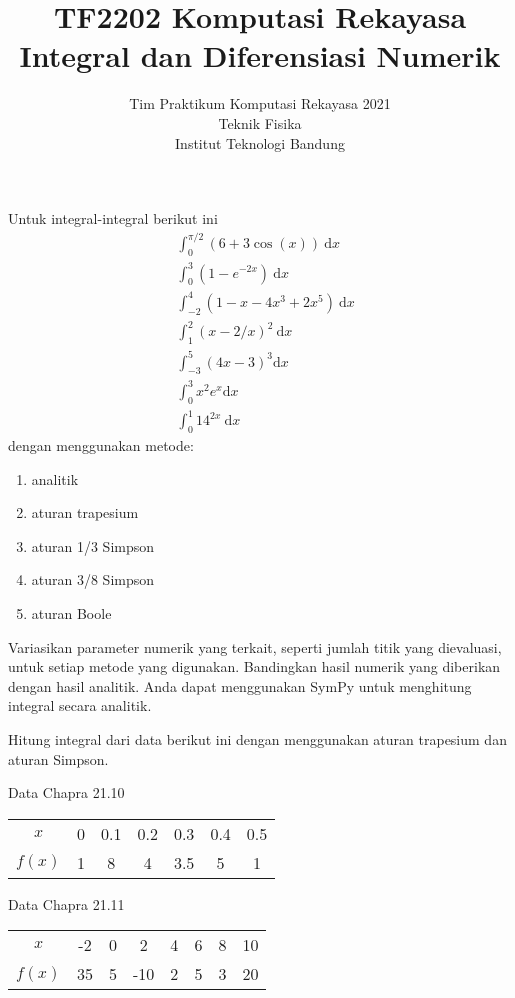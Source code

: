 



\title{%
{\small TF2202 Komputasi Rekayasa}\\
Integral dan Diferensiasi Numerik
}
\author{Tim Praktikum Komputasi Rekayasa 2021\\
Teknik Fisika\\
Institut Teknologi Bandung}
\date{}
\maketitle

\begin{soal}
Untuk integral-integral berikut ini
\begin{align}
& \int_{0}^{\pi/2} (6 + 3\cos(x))\ \mathrm{d}x \\
& \int_{0}^{3} (1 - e^{-2x})\ \mathrm{d}x \\
& \int_{-2}^{4} (1 - x - 4x^3 + 2x^5)\ \mathrm{d}x \\
& \int_{1}^{2} (x - 2/x)^2\ \mathrm{d}x \\
& \int_{-3}^{5} (4x - 3)^3 \mathrm{d}x \\
& \int_{0}^{3} x^2 e^x \mathrm{d}x \\
& \int_{0}^{1} 14^{2x}\ \mathrm{d}x
\end{align}
dengan menggunakan metode:
\begin{enumerate}[label=(\alph*)]
\item analitik
\item aturan trapesium
\item aturan 1/3 Simpson
\item aturan 3/8 Simpson
\item aturan Boole
\end{enumerate}
Variasikan parameter numerik yang terkait, seperti jumlah titik yang dievaluasi,
untuk setiap metode yang digunakan.
Bandingkan hasil numerik yang diberikan dengan hasil analitik.
Anda dapat menggunakan SymPy untuk menghitung integral secara analitik.
\end{soal}

\begin{soal}
Hitung integral dari data berikut ini dengan menggunakan aturan trapesium dan aturan
Simpson.

Data Chapra 21.10

{\centering
\begin{tabular}{|c|cccccc|}
\hline
$x$    & 0 & 0.1 & 0.2 & 0.3 & 0.4 & 0.5 \\
$f(x)$ & 1 & 8   & 4   & 3.5 & 5   & 1 \\
\hline
\end{tabular}
\par}

Data Chapra 21.11

{\centering
\begin{tabular}{|c|ccccccc|}
\hline
$x$    & -2 & 0 & 2 & 4 & 6 & 8 & 10 \\
$f(x)$ & 35 & 5 & -10 & 2 & 5 & 3 & 20 \\
\hline
\end{tabular}
\par}
\end{soal}

